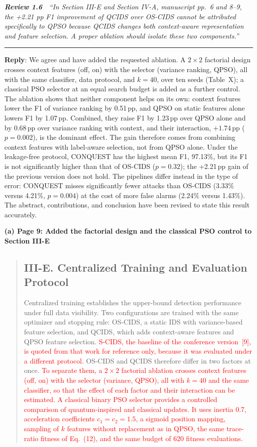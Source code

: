 \documentclass[11pt]{article}
\newenvironment{excerpt}{\begin{quote}\sloppy}{\end{quote}}
\newcommand{\review}[2]{\par\bigskip\noindent\textbf{\textit{Review #1}}\ \ \textit{``#2''}\par\smallskip\hrule\medskip}
\newcommand{\reply}{\noindent\textbf{Reply}: }
\newcommand{\mshead}[2]{\subsection*{\textbf{#1. #2}}}
\newcommand{\loc}[1]{\par\medskip\noindent\textbf{#1}\par}
\begin{document}
\review{1.6}{In Section III-E and Section IV-A, manuscript pp.~6 and 8--9, the +2.21 pp F1 improvement of QCIDS over OS-CIDS cannot be attributed specifically to QPSO because QCIDS changes both context-aware representation and feature selection. A proper ablation should isolate these two components.}

\reply We agree and have added the requested ablation. A $2\times2$ factorial
design crosses context features (off, on) with the selector (variance
ranking, QPSO), all with the same classifier, data protocol, and $k=40$, over
ten seeds (Table~X); a classical PSO selector at an equal search budget is
added as a further control. The ablation shows that neither component helps
on its own: context features lower the F1 of variance ranking by 0.51\,pp,
and QPSO on static features alone lowers F1 by 1.07\,pp. Combined, they raise
F1 by 1.23\,pp over QPSO alone and by 0.68\,pp over variance ranking with
context, and their interaction, $+1.74$\,pp ($p=0.002$), is the dominant
effect. The gain therefore comes from combining context features with
label-aware selection, not from QPSO alone. Under the leakage-free protocol,
CONQUEST has the highest mean F1, 97.13\%, but its F1 is not significantly
higher than that of OS-CIDS ($p=0.32$); the +2.21\,pp gain of the previous
version does not hold. The pipelines differ instead in the type of error:
CONQUEST misses significantly fewer attacks than OS-CIDS (3.33\% versus
4.21\%, $p=0.004$) at the cost of more false alarms (2.24\% versus 1.43\%).
The abstract, contributions, and conclusion have been revised to state this
result accurately.

\loc{(a) Page 9: Added the factorial design and the classical PSO control to Section III-E}
\begin{excerpt}
\mshead{III-E}{Centralized Training and Evaluation Protocol}


Centralized training establishes the upper-bound detection
performance under full data visibility. 
Two configurations are trained with the same optimizer and stopping
rule: OS-CIDS, a static IDS with variance-based feature selection,
and QCIDS, which adds context-aware features and QPSO feature
selection. \textcolor{red}{S-CIDS, the baseline of the conference
version~{[9]}, is quoted from that work for reference
only, because it was evaluated under a different protocol.}
OS-CIDS and QCIDS therefore differ in two factors at once.
\textcolor{red}{To separate them, a $2\times2$ factorial
ablation crosses context features (off, on) with the selector
(variance, QPSO), all with $k=40$ and the same classifier, so that the
effect of each factor and their interaction can be estimated. A
classical binary PSO selector provides a controlled comparison of
quantum-inspired and classical updates. It uses inertia 0.7,
acceleration coefficients $c_1=c_2=1.5$, a sigmoid position mapping,
sampling of $k$ features without replacement as in QPSO, the same trace-ratio fitness of Eq.~(12), and the
same budget of 620 fitness evaluations.}
\end{excerpt}
\end{document}
